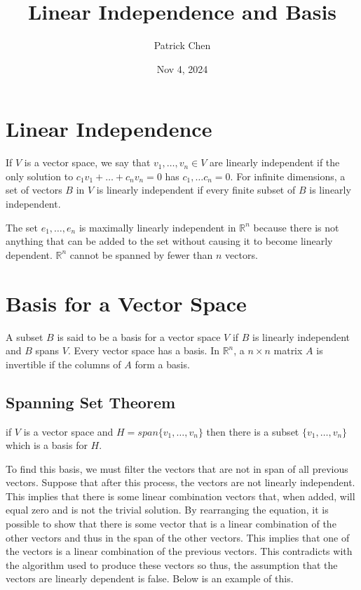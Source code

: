 \documentclass{article}
\title{Linear Independence and Basis}
\author{Patrick Chen}
\date{Nov 4, 2024}
\theoremstyle{mytheoremstyle}
\theoremstyle{mytheoremstyle}
\theoremstyle{myproblemstyle}
\begin{document}
    \maketitle
    \section*{Linear Independence}
    If $V$ is a vector space, we say that $v_1,\dots,v_n\in V$ are linearly
    independent if the only solution to $c_1v_1+\dots+c_nv_n=0$ has $c_1,\dots
    c_n = 0$. For infinite dimensions, a set of vectors $B$ in $V$ is linearly
    independent if every finite subset of $B$ is linearly independent.

    The set $e_1,\dots,e_n$ is maximally linearly independent in $\mathbb{R}^n$
    because there is not anything that can be added to the set without causing
    it to become linearly dependent. $\mathbb{R}^n$ cannot be spanned by fewer
    than $n$ vectors.


    \section*{Basis for a Vector Space}
    A subset $B$ is said to be a basis for a vector space $V$ if $B$  is
    linearly independent and $B$ spans $V$. Every vector space has a basis. In
    $\mathbb{R}^n$, a $n\times n$ matrix $A$ is invertible if the columns of $A$
    form a basis.

    \subsection*{Spanning Set Theorem}
    if $V$ is a vector space and $H = span\{v_1,\dots,v_n\}$ then there is a
    subset $\{v_1,\dots,v_n\}$ which is a basis for $H$.

    To find this basis, we must filter the vectors that are not in span of all
    previous vectors. Suppose that after this process, the vectors are not
    linearly independent. This implies that there is some linear combination
    vectors that, when added, will equal zero and is not the trivial solution.
    By rearranging the equation, it is possible to show that there is some
    vector that is a linear combination of the other vectors and thus in the
    span of the other vectors. This implies that one of the vectors is a linear
    combination of the previous vectors. This contradicts with the algorithm
    used to produce these vectors so thus, the assumption that the vectors are
    linearly dependent is false. Below is an example of this.
\end{document}
